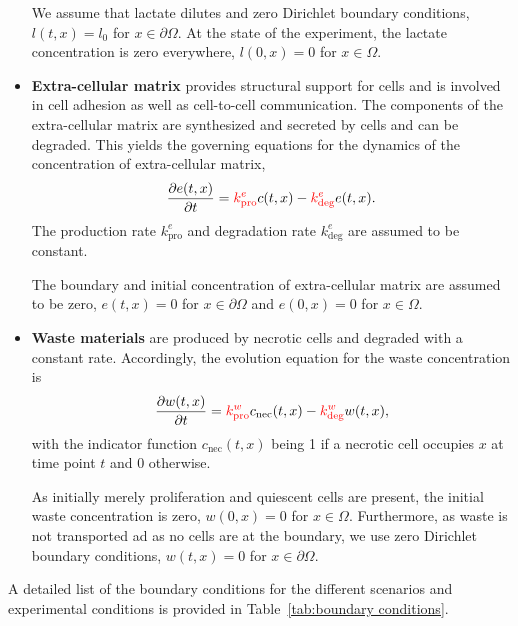 \documentclass[10pt,letterpaper]{article}
\begin{document}
\begin{itemize}
We assume that lactate dilutes and zero Dirichlet boundary conditions, $l(t,x) = l_0$ for $x \in \partial\Omega$. At the state of the experiment, the lactate concentration is zero everywhere,  $l(0,x) = 0$ for $x \in \Omega$.
%
\item \textbf{Extra-cellular matrix} provides structural support for cells and is involved in cell adhesion as well as cell-to-cell communication. The components of the extra-cellular matrix are synthesized and secreted by cells and can be degraded. This yields the governing equations for the dynamics of the concentration of extra-cellular matrix,
\begin{equation*}
	\frac{\partial e(t,x)}{\partial t} = {\color{red}{k^{e}_{\text{pro}}}} c(t,x) - {\color{red}{k^{e}_{\text{deg}}}} e(t,x).
\end{equation*}
The production rate {\color{red}$k^{e}_{\text{pro}}$} and degradation rate {\color{red}$k^{e}_{\text{deg}}$} are assumed to be constant.

The boundary and initial concentration of extra-cellular matrix are assumed to be zero, $e(t,x) = 0$ for $x \in \partial\Omega$ and $e(0,x) = 0$ for $x \in \Omega$.
%
\item \textbf{Waste materials} are produced by necrotic cells and degraded with a constant rate. Accordingly, the evolution equation for the waste concentration is 
\begin{equation*}
	\frac{\partial w(t,x)}{\partial t} = {\color{red}{k^{w}_{\text{pro}}}} c_{\text{nec}}(t,x) - {\color{red}{k^{w}_{\text{deg}}}} w(t,x),
\end{equation*}
with the indicator function $c_{\text{nec}}(t,x)$ being 1 if a necrotic cell occupies $x$ at time point $t$ and 0 otherwise.

As initially merely proliferation and quiescent cells are present, the initial waste concentration is zero, $w(0,x) = 0$ for $x \in \Omega$. Furthermore, as waste is not transported ad as no cells are at the boundary, we use zero Dirichlet boundary conditions, $w(t,x) = 0$ for $x \in \partial\Omega$.
\end{itemize}
A detailed list of the boundary conditions for the different scenarios and experimental conditions is provided in Table~\ref{tab:boundary conditions}.

\end{document}
